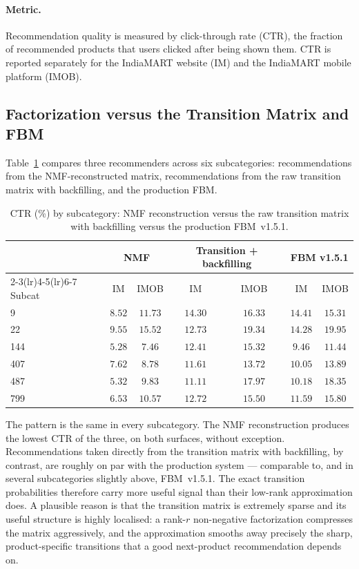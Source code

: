 \paragraph{Metric.}
Recommendation quality is measured by click-through rate (CTR), the fraction of
recommended products that users clicked after being shown them. CTR is reported
separately for the IndiaMART website (IM) and the IndiaMART mobile platform
(IMOB).

\subsection{Factorization versus the Transition Matrix and FBM}
\label{sec:mf-ctr-subcat}

Table~\ref{tab:mf-ctr-subcat} compares three recommenders across six
subcategories: recommendations from the NMF-reconstructed matrix, recommendations
from the raw transition matrix with backfilling, and the production FBM.

\begin{table}[ht]
  \centering
  \caption{CTR (\%) by subcategory: NMF reconstruction versus the raw transition
           matrix with backfilling versus the production FBM~v1.5.1.}
  \label{tab:mf-ctr-subcat}
  \small
  \begin{tabular}{lcccccc}
    \toprule
    & \multicolumn{2}{c}{NMF} & \multicolumn{2}{c}{Transition + backfilling}
    & \multicolumn{2}{c}{FBM v1.5.1} \\
    \cmidrule(lr){2-3}\cmidrule(lr){4-5}\cmidrule(lr){6-7}
    Subcat & IM & IMOB & IM & IMOB & IM & IMOB \\
    \midrule
    9   & $8.52$ & $11.73$ & $14.30$ & $16.33$ & $14.41$ & $15.31$ \\
    22  & $9.55$ & $15.52$ & $12.73$ & $19.34$ & $14.28$ & $19.95$ \\
    144 & $5.28$ & $7.46$  & $12.41$ & $15.32$ & $9.46$  & $11.44$ \\
    407 & $7.62$ & $8.78$  & $11.61$ & $13.72$ & $10.05$ & $13.89$ \\
    487 & $5.32$ & $9.83$  & $11.11$ & $17.97$ & $10.18$ & $18.35$ \\
    799 & $6.53$ & $10.57$ & $12.72$ & $15.50$ & $11.59$ & $15.80$ \\
    \bottomrule
  \end{tabular}
\end{table}

The pattern is the same in every subcategory. The NMF reconstruction produces the
lowest CTR of the three, on both surfaces, without exception. Recommendations
taken directly from the transition matrix with backfilling, by contrast, are
roughly on par with the production system --- comparable to, and in several
subcategories slightly above, FBM~v1.5.1. The exact transition probabilities
therefore carry more useful signal than their low-rank approximation does. A
plausible reason is that the transition matrix is extremely sparse and its useful
structure is highly localised: a rank-$r$ non-negative factorization compresses
the matrix aggressively, and the approximation smooths away precisely the sharp,
product-specific transitions that a good next-product recommendation depends on.

